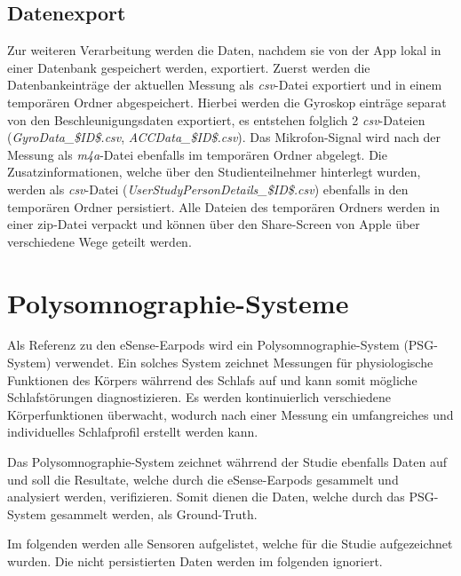\subsection{Datenexport}
\label{ch:sa:ep:export}
Zur weiteren Verarbeitung werden die Daten, nachdem sie von der App lokal in einer Datenbank gespeichert werden, exportiert. 
Zuerst werden die Datenbankeinträge der aktuellen Messung als \textit{csv}-Datei exportiert und in einem temporären Ordner abgespeichert.
Hierbei werden die Gyroskop einträge separat von den Beschleunigungsdaten exportiert, es entstehen folglich 2 \textit{csv}-Dateien (\glqq \textit{GyroData\_\$ID\$.csv}\grqq, \glqq \textit{ACCData\_\$ID\$.csv}\grqq).
Das Mikrofon-Signal wird nach der Messung als \textit{m4a}-Datei ebenfalls im temporären Ordner abgelegt.
Die Zusatzinformationen, welche über den Studienteilnehmer hinterlegt wurden, werden als \textit{csv}-Datei (\glqq \textit{UserStudyPersonDetails\_\$ID\$.csv}\grqq) ebenfalls in den temporären Ordner persistiert.
Alle Dateien des temporären Ordners werden in einer zip-Datei verpackt und können über den Share-Screen von Apple über verschiedene Wege geteilt werden.

\section{Polysomnographie-Systeme}
\label{ch:sa:psg}
Als Referenz zu den eSense-Earpods wird ein Polysomnographie-System (PSG-System) verwendet. 
Ein solches System zeichnet Messungen für physiologische Funktionen des Körpers währrend des Schlafs auf und kann somit mögliche Schlafstörungen diagnostizieren.
Es werden kontinuierlich verschiedene Körperfunktionen überwacht, wodurch nach einer Messung ein umfangreiches und individuelles Schlafprofil erstellt werden kann.

Das Polysomnographie-System zeichnet währrend der Studie ebenfalls Daten auf und soll die Resultate, welche durch die eSense-Earpods gesammelt und analysiert werden, verifizieren. Somit dienen die Daten, welche durch das PSG-System gesammelt werden, als \glqq Ground-Truth\grqq.


Im folgenden werden alle Sensoren aufgelistet, welche für die Studie aufgezeichnet wurden. Die nicht persistierten Daten werden im folgenden ignoriert.


